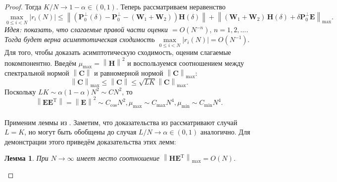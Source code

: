 \documentclass[specialist,
               substylefile = spbu_report.rtx,
               subf,href,colorlinks=true, 12pt]{disser}
\newcommand\norm[1]{\left\|#1\right\|}
\newtheorem{lemma}{Лемма}
\begin{document}
\begin{proof}
Тогда $K/N \rightarrow 1 - \alpha \in (0,1)$. 
Теперь рассматриваем неравенство
\begin{equation*}
	\max_{0\leqslant i<N} |r_i(N)|\leqslant \norm{(\mathbf{P}_0^\bot(\delta)- \mathbf{P}_0^\bot-(\mathbf{W}_1+\mathbf{W}_2))\mathbf{H}(\delta)} + \norm{ (\mathbf{W}_1+\mathbf{W}_2)\, \mathbf{H}(\delta) + \delta \mathbf{P}_0^\perp \mathbf{E}}_{\max}.
\end{equation*}
\emph{Идея: показать, что слагаемые правой части оценки $= O(N^{-n}),\,n=1,2,\dots$. Тогда будет верна асимптотическая сходимость $\max\limits_{0\leqslant i < N}|r_i(N)|=O(N^{-1})$}.
\\
Для того, чтобы доказать асимптотическую сходимость, оценим слагаемые покомпонентно. Введём $\mu_{\max} = \norm{\mathbf{H}}^2$ и воспользуемся соотношением между спектральной нормой $\norm{\mathbf{C}}$ и равномерной нормой $\norm{\mathbf{C}}_{\max}$:
\begin{equation*}
	\norm{\mathbf{C}}_{\max} \leqslant\norm{\mathbf{C} }\leqslant \sqrt{LK}\norm{\mathbf{C}}_{\max}.
\end{equation*}
Поскольку $LK\sim \alpha(1-\alpha)N^2\sim CN^2$, то \begin{equation}
	\norm{\mathbf{EE}^\mathrm{T}} = \norm{\mathbf{E}}^2\sim C_{\cos}N^2, \mu_{\max} \sim C_{\max}N^4, \mu_{\min} \sim C_{\min}N^4.\label{eq:asymp_1}
\end{equation}
\\Применим леммы из \cite{ZNekrutkin}. Заметим, что доказательства из \cite{ZNekrutkin}  рассматривают случай $L=K$, но могут быть обобщены до случая $L/N\rightarrow\alpha\in(0,1)$ аналогично. Для демонстрации этого приведём доказательства этих лемм:
\begin{lemma}\label{lem:2}
	При $N\rightarrow\infty$ имеет место соотношение $\norm{\mathbf{HE}^\mathrm{T}}_{\max} = O(N)$.
\end{lemma}


\end{proof}
\end{document}
